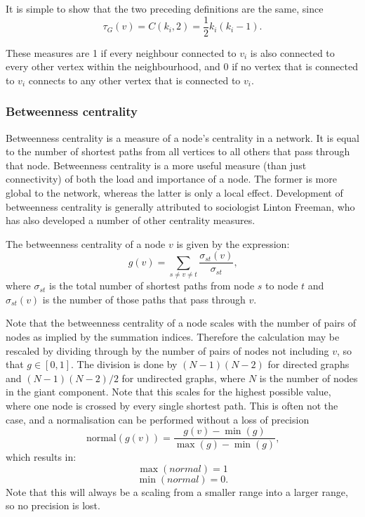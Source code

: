         It is simple to show that the two preceding definitions are the same, since
        $$\tau_G(v) = C({k_i},2) = \frac{1}{2}k_i(k_i-1) \mbox{.}$$

        These measures are 1 if every neighbour connected to $v_i$ is also connected to every other vertex within the neighbourhood, and 0 if no vertex that is connected to $v_i$ connects to any other vertex that is connected to $v_i$.

    \subsubsection{Betweenness centrality}
        
      Betweenness centrality is a measure of a node's centrality in a network. It is equal to the number of shortest paths from all vertices to all others that pass through that node. Betweenness centrality is a more useful measure (than just connectivity) of both the load and importance of a node. The former is more global to the network, whereas the latter is only a local effect. Development of betweenness centrality is generally attributed to sociologist Linton Freeman, who has also developed a number of other centrality measures\cite{Freeman1977}.
          
      The betweenness centrality of a node $v$ is given by the expression:
      $$g(v) = \sum_{s \neq v \neq t} \frac{\sigma_{st}(v)}{\sigma_{st}} \mbox{,}$$
      where $\sigma_{st}$ is the total number of shortest paths from node $s$ to node $t$ and $\sigma_{st}(v)$ is the number of those paths that pass through $v$.
          
      Note that the betweenness centrality of a node scales with the number of pairs of nodes as implied by the summation indices. Therefore the calculation may be rescaled by dividing through by the number of pairs of nodes not including $v$, so that $g \in [0,1]$. The division is done by $(N-1)(N-2)$ for directed graphs and $(N-1)(N-2)/2$ for undirected graphs, where $N$ is the number of nodes in the giant component. Note that this scales for the highest possible value, where one node is crossed by every single shortest path. This is often not the case, and a normalisation can be performed without a loss of precision
      $$\mbox{normal}(g(v)) = \frac{g(v) - \min(g)}{\max(g) - \min(g)}\mbox{,}$$
      which results in:
      $$\max(normal) = 1$$
      $$\min(normal) = 0 \mbox{.}$$
      Note that this will always be a scaling from a smaller range into a larger range, so no precision is lost.
      
